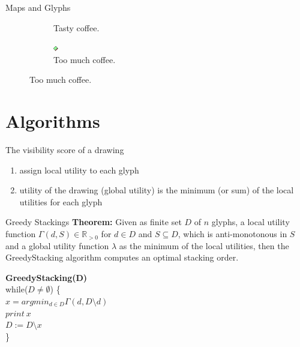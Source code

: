 \documentclass{beamer}
\newcommand\tab[1][1cm]{\hspace*{#1}}
\begin{document}
\begin{frame}{Maps and Glyphs}
\begin{figure}[!b]
\begin{subfigure}[b]{0.45\linewidth}
      \caption{Tasty coffee.}
    \end{subfigure}
    \begin{subfigure}[b]{0.45\linewidth}
      \centering
      \includegraphics[width=0.5\linewidth]{assets/symbol_square}
      \caption{Too much coffee.}
    \end{subfigure}
  \end{figure}

\end{frame}

\section{Algorithms}

\begin{frame}{The visibility score of a drawing}
    \begin{enumerate}
        \item assign local utility to each glyph
        \item utility of the drawing (global utility) is the minimum (or sum) of the local utilities for each glyph
    \end{enumerate}
\end{frame}

\begin{frame}{Greedy Stackings}
    \textbf{Theorem:} Given as finite set $D$ of $n$ glyphs, a local utility function $\Gamma(d, S) \in \mathbb{R}_{>0}$ for $d\in D$ and $S\subseteq D$, which is anti-monotonous in $S$ and a global utility function $\lambda$ as the minimum of the local utilities, then the GreedyStacking algorithm computes an optimal stacking order.
    
    \pause
    
    \textbf{GreedyStacking(D)}\\
    while($D\neq \emptyset$) \{\\ 
        \tab$x=argmin_{d\in D} \Gamma(d, D\setminus d)$\\
        \tab$print\ x$\\
        \tab$D:=D\setminus x$\\
    \}
\end{frame}
\end{document}
